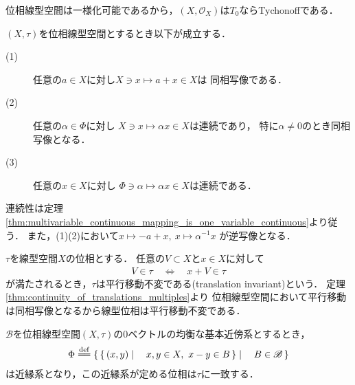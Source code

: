 	
	位相線型空間は一様化可能であるから，$(X,\mathscr{O}_X)$は$T_0$ならTychonoffである．
	
	
	\begin{screen}
		\begin{thm}\label{thm:continuity_of_translations_multiples}
			$(X,\tau)$を位相線型空間とするとき以下が成立する．
			\begin{description}
				\item[(1)] 任意の$a \in X$に対し$X \ni x \longmapsto a + x \in X$は
					同相写像である．
					
				\item[(2)] 任意の$\alpha \in \Phi$に対し
					$X \ni x \longmapsto \alpha x \in X$は連続であり，
					特に$\alpha \neq 0$のとき同相写像となる．
					
				\item[(3)] 任意の$x \in X$に対し
					$\Phi \ni \alpha \longmapsto \alpha x \in X$は連続である．
			\end{description}
		\end{thm}
	\end{screen}
	
	\begin{prf}
		連続性は定理\ref{thm:multivariable_continuous_mapping_is_one_variable_continuous}より従う．
		また，(1)(2)において$x \longmapsto -a+x,\ x \longmapsto \alpha^{-1}x$
		が逆写像となる．
		\QED
	\end{prf}
	
	\begin{screen}
		\begin{thm}[平行移動不変位相]
			$\tau$を線型空間$X$の位相とする．
			任意の$V \subset X$と$x \in X$に対して
			\begin{align}
				V \in \tau \quad \Longleftrightarrow \quad
				x + V \in \tau
			\end{align}
			が満たされるとき，$\tau$は平行移動不変である(translation invariant)という．
			定理\ref{thm:continuity_of_translations_multiples}より
			位相線型空間において平行移動は同相写像となるから線型位相は平行移動不変である．
		\end{thm}
	\end{screen}
	
	\begin{screen}
		\begin{thm}[位相線型空間は一様空間]
			$\mathscr{B}$を位相線型空間$(X,\tau)$の0ベクトルの均衡な基本近傍系とするとき，
			\begin{align}
				\Phi \defeq
				\Set{\Set{(x,y)}{x,y \in X,\ x-y \in B}}{B \in \mathscr{B}}
			\end{align}
			は近縁系となり，この近縁系が定める位相は$\tau$に一致する．
		\end{thm}
	\end{screen}
	
